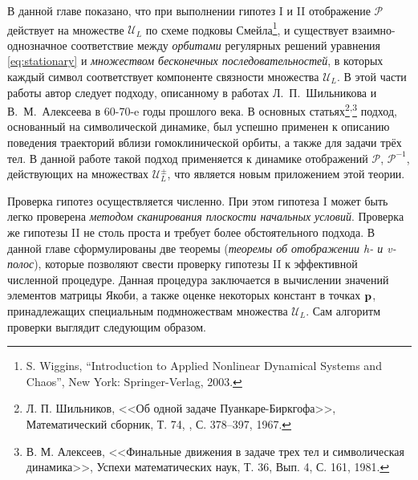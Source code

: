 \documentclass[candidate, href, colorlinks]{disser}
\begin{document}
В данной главе показано, что при выполнении гипотез I и II отображение $\mathcal{P}$ действует на множестве $\mathscr{U}_L$ по схеме подковы Смейла\footnote{S. Wiggins, ``Introduction to Applied Nonlinear Dynamical Systems and Chaos'', New York: Springer-Verlag, 2003.}, и существует взаимно-однозначное соответствие между {\it орбитами} регулярных решений уравнения \eqref{eq:stationary} и {\it множеством бесконечных последовательностей}, в которых каждый символ соответствует компоненте связности множества $\mathscr{U}_L$.
В этой части работы автор следует подходу, описанному в работах Л.~П.~Шильникова и В.~М.~Алексеева в 60-70-e годы прошлого века.
В основных статьях\footnote{Л. П. Шильников, <<Об одной задаче Пуанкаре-Биркгофа>>, Математический сборник, Т. 74, , С. 378--397,  1967.}\textsuperscript{,}\footnote{В. М. Алексеев, <<Финальные движения в задаче трех тел и символическая динамика>>, Успехи математических наук, Т. 36, Вып. 4, С. 161, 1981.} подход, основанный на символической динамике, был успешно применен к описанию поведения траекторий вблизи гомоклинической орбиты, а также для задачи трёх тел.
В данной работе такой подход применяется к динамике отображений $\mathcal{P}$, $\mathcal{P}^{-1}$, действующих на множествах $\mathscr{U}_L^{\pm}$, что является новым приложением этой теории.

Проверка гипотез осуществляется численно.
При этом гипотеза I может быть легко проверена {\it методом сканирования плоскости начальных условий}.
Проверка же гипотезы II не столь проста и требует более обстоятельного подхода.
В данной главе сформулированы две теоремы ({\it теоремы об отображении h- и v-полос}), которые позволяют свести проверку гипотезы II к эффективной численной процедуре.
Данная процедура заключается в вычислении значений элементов матрицы Якоби, а также оценке некоторых констант в точках $\vb{p}$, принадлежащих специальным подмножествам множества $\mathscr{U}_L$.
Сам алгоритм проверки выглядит следующим образом.
\end{document}
